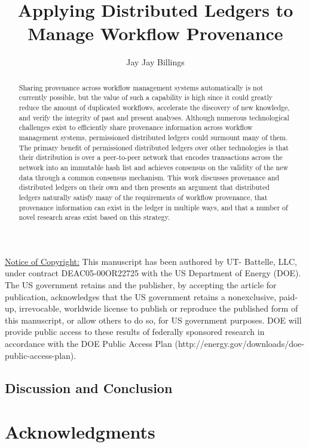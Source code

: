 \documentclass[sigconf]{acmart}
\begin{document}
\title{Applying Distributed Ledgers to Manage Workflow Provenance}

\author{Jay Jay Billings}


\begin{abstract}
Sharing provenance across workflow management systems automatically is not
currently possible, but the value of such a capability is high since it could
greatly reduce the amount of duplicated workflows, accelerate the discovery of
new knowledge, and verify the integrity of past and present analyses. Although
numerous technological challenges exist to efficiently share provenance
information across workflow management systems, permissioned distributed ledgers
could surmount many of them. The primary benefit of permissioned distributed
ledgers over other technologies is that their distribution is over a
peer-to-peer network that encodes transactions across the network into an
immutable hash list and achieves consensus on the validity of the new data
through a common consensus mechanism. This work discusses provenance and
distributed ledgers on their own and then presents an argument that distributed
ledgers naturally satisfy many of the requirements of workflow provenance, that
provenance information can exist in the ledger in multiple ways, and that a
number of novel research areas exist based on this strategy.
\end{abstract}



\maketitle

\underline{Notice of Copyright:} This manuscript has been authored by UT-
Battelle, LLC, under contract DEAC05-00OR22725 with the US Department of
Energy (DOE). The US government retains and the publisher, by accepting
the article for publication, acknowledges that the US government
retains a nonexclusive, paid-up, irrevocable, worldwide license to publish or
reproduce the published form of this manuscript, or allow others to do so, for
US government purposes. DOE will provide
public access to these results of federally sponsored research in accordance
with the DOE Public Access Plan (http://energy.gov/downloads/doe-public-access-plan).


\subsection{Discussion and Conclusion}



\section*{Acknowledgments}\label{acknowledgments}




\end{document}
